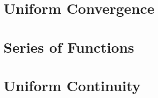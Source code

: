 \documentclass[british,11pt,a4paper]{report}
\begin{document}
\maketitle
\tableofcontents

\chapter{Uniform Convergence}

\chapter{Series of Functions}

\chapter{Uniform Continuity}

\end{document}
